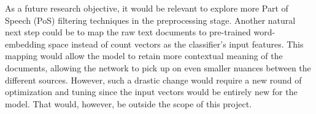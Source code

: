 As a future research objective, it would be relevant to explore more Part of Speech (PoS) filtering techniques in the preprocessing stage. Another natural next step could be to map the raw text documents to pre-trained word-embedding space instead of count vectors as the classifier's input features. This mapping would allow the model to retain more contextual meaning of the documents, allowing the network to pick up on even smaller nuances between the different sources. However, such a drastic change would require a new round of optimization and tuning since the input vectors would be entirely new for the model. That would, however,  be outside the scope of this project.
